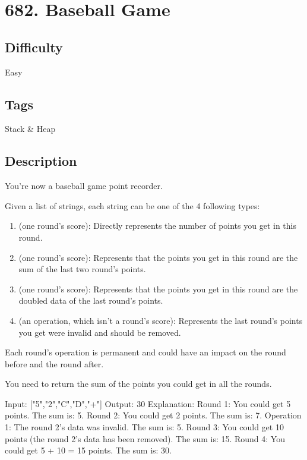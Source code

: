 \tocless\section{682. Baseball Game}
\label{algo:682}

\subsection*{Difficulty}
Easy

\subsection*{Tags}
Stack \& Heap

\subsection*{Description}
You're now a baseball game point recorder.

Given a list of strings, each string can be one of the 4 following types:
\begin{enumerate}
\item {} (one round's score): Directly represents the number of points you get in this round.
\item {} (one round's score): Represents that the points you get in this round are the sum of the last two  round's points.
\item {} (one round's score): Represents that the points you get in this round are the doubled data of the last  round's points.
\item {} (an operation, which isn't a round's score): Represents the last  round's points you get were invalid and should be removed.
\end{enumerate}

Each round's operation is permanent and could have an impact on the round before and the round after.

You need to return the sum of the points you could get in all the rounds.

\begin{example}
\begin{multilinecode}
Input: ["5","2","C","D","+"]
Output: 30
Explanation:
Round 1: You could get 5 points. The sum is: 5.
Round 2: You could get 2 points. The sum is: 7.
Operation 1: The round 2's data was invalid. The sum is: 5.  
Round 3: You could get 10 points (the round 2's data has been removed). The sum is: 15.
Round 4: You could get 5 + 10 = 15 points. The sum is: 30.
\end{multilinecode}
\end{example}

